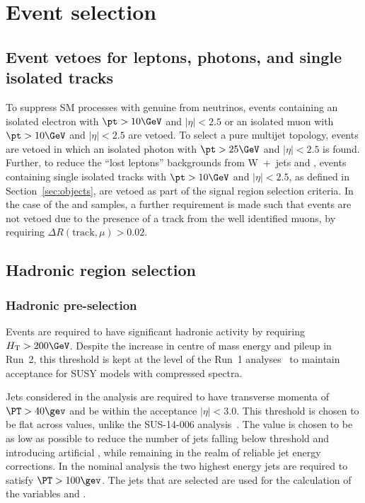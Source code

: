 \section{Event selection}
\label{sec:selection}

\subsection{Event vetoes for leptons, photons, and single isolated tracks\label{sec:vetoes}}

To suppress SM processes with genuine \met from neutrinos, events
containing an isolated electron with $\pt > 10\GeV$ and $|\eta| < 2.5$ or an isolated muon
with $\pt > 10\GeV$ and $|\eta| < 2.5$ are vetoed. To select a pure
multijet topology, events are vetoed in which an isolated
photon with $\pt > 25\GeV$ and $|\eta| < 2.5$ is
found.  Further, to reduce the ``lost leptons'' backgrounds from W~+~jets 
and \ttbar, events containing single isolated tracks with $\pt >
10\GeV$ and $|\eta| < 2.5$, as defined in
Section~\ref{sec:objects}, are vetoed as part of the signal
region selection criteria. In the case of the \mj and \mmj
samples, a further requirement is made such that events are not vetoed
due to the presence of a track from the well identified muons, by
requiring $\Delta R(\textrm{track},\mu) > 0.02$.


\subsection{Hadronic region selection}
\label{sec:hadSelection}

\subsubsection{Hadronic pre-selection}
Events are required to have significant hadronic activity by requiring
$\scalht > 200\GeV$. Despite the increase in centre of mass energy and pileup
in Run~2, this threshold is kept at the level of the Run~1 analyses~\cite{Chatrchyan:2013lya}  
to maintain acceptance for SUSY models with compressed spectra.

Jets considered in the analysis are required to have transverse momenta of $\PT>40\gev$ and be
within the acceptance $|\eta|<3.0$. This threshold is chosen
to be flat across \HT values, unlike the SUS-14-006 analysis~\cite{CMS_AN_2013-366}. The \PT value is
chosen to be as low as possible to reduce the number of jets falling below
threshold and introducing artificial \mht, while remaining in the realm of
reliable jet energy corrections. In the nominal analysis the two highest energy jets
are required to satisfy $\PT>100\gev$.%
The jets that are selected are used for the calculation of the variables \HT and \mht.

